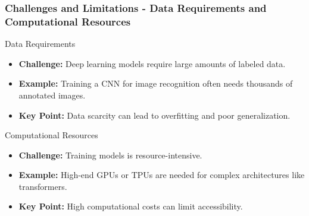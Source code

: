 \documentclass[aspectratio=169]{beamer}
\begin{document}
\begin{frame}[fragile]
    \frametitle{Challenges and Limitations - Data Requirements and Computational Resources}
    \begin{block}{Data Requirements}
        \begin{itemize}
            \item \textbf{Challenge:} Deep learning models require large amounts of labeled data.
            \item \textbf{Example:} Training a CNN for image recognition often needs thousands of annotated images.
            \item \textbf{Key Point:} Data scarcity can lead to overfitting and poor generalization.
        \end{itemize}
    \end{block}

    \begin{block}{Computational Resources}
        \begin{itemize}
            \item \textbf{Challenge:} Training models is resource-intensive.
            \item \textbf{Example:} High-end GPUs or TPUs are needed for complex architectures like transformers.
            \item \textbf{Key Point:} High computational costs can limit accessibility.
        \end{itemize}
    \end{block}
\end{frame}
\end{document}
